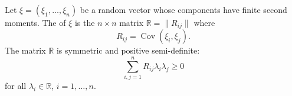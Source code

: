 Let $\xi = (\xi_1, \ldots, \xi_n)$ be a random vector whose components have finite second moments. The  of $\xi$ is the $n \times n$ matrix $\mathbb{R} = \|R_{ij}\|$ where
$$R_{ij} = \operatorname{Cov}(\xi_i, \xi_j).$$
The matrix $\mathbb{R}$ is symmetric and positive semi-definite:
$$\sum_{i,j=1}^{n} R_{ij} \lambda_i \lambda_j \geq 0$$
for all $\lambda_i \in \mathbb{R}$, $i = 1, \ldots, n$.
